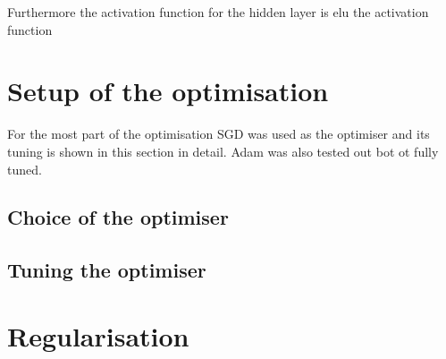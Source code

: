 Furthermore the activation function for the hidden layer is elu
the activation function 

\section{Setup of the optimisation}

For the most part of the optimisation SGD was used as the optimiser and its tuning is shown in this section in detail.
Adam was also tested out bot ot fully tuned.

\subsection{Choice of the optimiser}

\subsection{Tuning the optimiser}



\section{Regularisation}